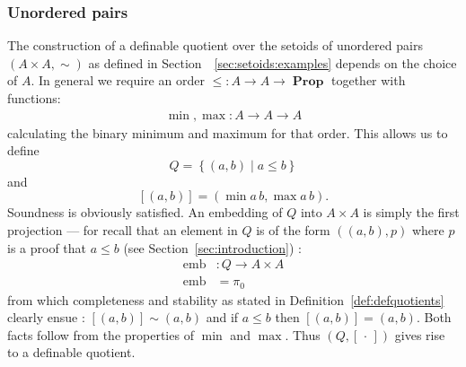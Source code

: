 \documentclass[envcountsame]{llncs}
\newcommand{\dotph}{\,\cdot\,} %
\providecommand{\class}[1]{[#1]}
\providecommand{\set}  [1]{\left\{#1\right\}}
\DeclareMathOperator{\Prop}{\mathbf{Prop}}
\DeclareMathOperator{\emb}{emb}
\begin{document}
\subsubsection*{Unordered pairs}

The construction of a definable quotient over the setoids of unordered pairs $(A\times A,\sim)$ as defined in Section~~\ref{sec:setoids:examples} depends on the choice of $A$. In general we
require an order $\leq : A \to A \to \Prop$ together with functions:
\begin{align*}
\min, \max : A \to A \to A
\end{align*}
calculating the binary minimum and maximum for that order. This allows us to  define
\[
Q = \set{(a , b) \mid  a \leq b}
\]
and
\[ [(a,b)] = (\min a\, b, \max a \,b).\]
Soundness is obviously satisfied. An embedding of $Q$ into  $A\times A$ is simply the first projection --- for recall that an element in $Q$ is of the form $((a,b),p)$ where $p$ is a proof that $a\leq b$ (see Section~\ref{sec:introduction}) :
\begin{align*}
\emb &: Q \to A\times A\\
\emb &= \pi_0
\end{align*}
from which completeness and stability as stated in Definition~\ref{def:defquotients} clearly ensue : $[(a,b)] \sim (a,b)$ and if $a\leq b$ then $[(a,b)]=(a,b)$. Both facts follow from
 the properties of $\min$ and $\max$. 
Thus $(Q,\class\dotph)$ gives rise to a definable quotient.
\end{document}
